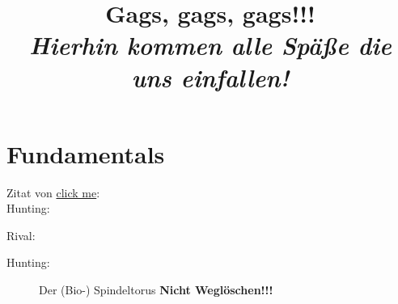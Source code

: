 \documentclass{article}
\title
{
  Gags, gags, gags!!! \\
  \vspace{4pt}
  \normalsize
  \textit{Hierhin kommen alle Späße die uns einfallen!}
}
\author{}
\date{}
\begin{document}
\maketitle

\section{Fundamentals}

Zitat von 
\href{https://knowyourphrase.com/how-do-you-like-them-apples}{click me}: \\

Hunting: 

Rival: 

Hunting: 

\begin{figure}[H]
\centering
{}
\hspace{0mm}
\caption{Der (Bio-) Spindeltorus \textbf{Nicht Weglöschen!!!}}
\label{fig:apfel_apple}
\end{figure}
\end{document}
